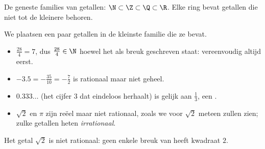 \begin{omfigure}

{\small De geneste families van getallen: $\N \subset \Z \subset \Q \subset
\R$. Elke ring bevat getallen die niet tot de kleinere behoren.}
\end{omfigure}

\begin{example}\label{ex:g10:numbers:classify}
We plaatsen een paar getallen in de kleinste familie die ze bevat.
\begin{itemize}
  \item $\frac{28}{4} = 7$, dus $\frac{28}{4} \in \N$ hoewel het als breuk
        geschreven staat: vereenvoudig altijd eerst.
  \item $-3.5 = -\frac{35}{10} = -\frac72$ is rationaal maar niet geheel.
  \item $0.333\dots$ (het cijfer $3$ dat eindeloos herhaalt) is gelijk aan
        $\frac13$, een .
  \item $\sqrt 2$ en $\pi$ zijn reëel maar niet rationaal, zoals we voor
        $\sqrt 2$ meteen zullen zien; zulke getallen heten
        \emph{irrationaal}.
\end{itemize}
\end{example}

\begin{theorem}\label{thm:g10:numbers:sqrt2}
Het getal $\sqrt 2$ is niet rationaal: geen enkele breuk van 
heeft kwadraat $2$.
\end{theorem}

